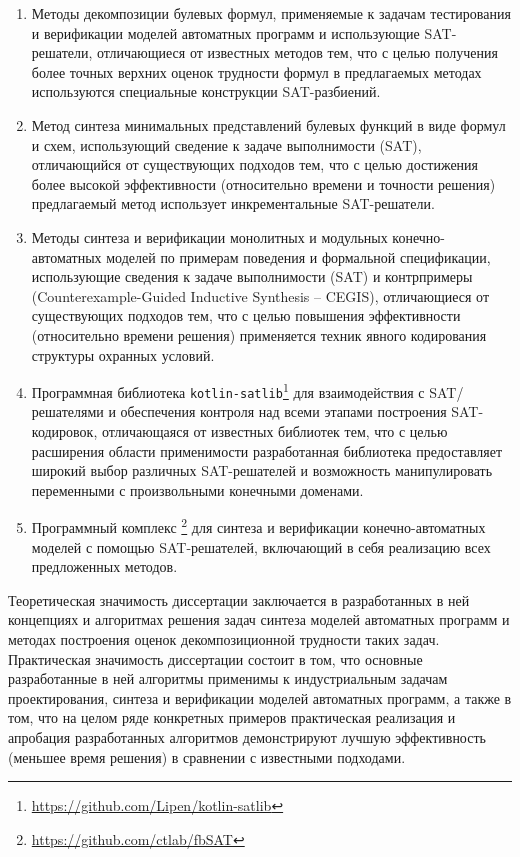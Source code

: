 %
%
\begin{enumerate}[beginpenalty=10000]
    \item Методы декомпозиции булевых формул, применяемые к задачам тестирования и верификации моделей автоматных программ и использующие SAT-решатели, отличающиеся от известных методов тем, что с целью получения более точных верхних оценок трудности формул в предлагаемых методах используются специальные конструкции SAT-разбиений.

    \item Метод синтеза минимальных представлений булевых функций в виде формул и схем, использующий сведение к задаче выполнимости (SAT), отличающийся от существующих подходов тем, что с целью достижения более высокой эффективности (относительно времени и точности решения) предлагаемый метод использует инкрементальные SAT-решатели.

    \item Методы синтеза и верификации монолитных и модульных конечно-автоматных моделей по примерам поведения и формальной спецификации, использующие сведения к задаче выполнимости (SAT) и контрпримеры (Counterexample-Guided Inductive Synthesis \--- CEGIS), отличающиеся от существующих подходов тем, что с целью повышения эффективности (относительно времени решения) применяется техник явного кодирования структуры охранных условий.

    \item Программная библиотека \texttt{kotlin-satlib}\footnote{\url{https://github.com/Lipen/kotlin-satlib}} для взаимодействия с SAT\-/решателями и обеспечения контроля над всеми этапами построения SAT-кодировок, отличающаяся от известных библиотек тем, что с целью расширения области применимости разработанная библиотека предоставляет широкий выбор различных SAT-решателей и возможность манипулировать переменными с произвольными конечными доменами.

    \item Программный комплекс \footnote{\url{https://github.com/ctlab/fbSAT}} для синтеза и верификации конечно-автоматных моделей с помощью SAT-решателей, включающий в себя реализацию всех предложенных методов.
\end{enumerate}


\influence
%
Теоретическая значимость диссертации заключается в разработанных в ней концепциях и алгоритмах решения задач синтеза моделей автоматных программ и методах построения оценок декомпозиционной трудности таких задач.
Практическая значимость диссертации состоит в том, что основные разработанные в ней алгоритмы применимы к индустриальным задачам проектирования, синтеза и верификации моделей автоматных программ, а также в том, что на целом ряде конкретных примеров практическая реализация и апробация разработанных алгоритмов демонстрируют лучшую эффективность (меньшее время решения) в сравнении с известными подходами.


